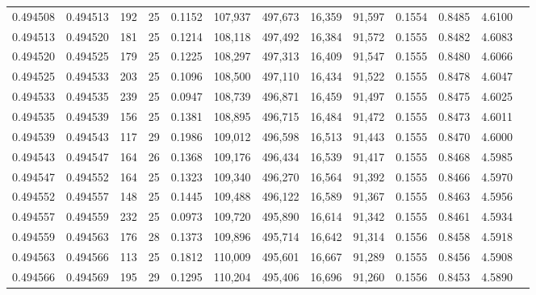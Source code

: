 \begin{tabular}{rrrrrrrrrrrrr}
0.494508 & 0.494513 & 192 &  25 &                                     0.1152 & 107,937 & 497,673 &  16,359 &  91,597 & 0.1554 & 0.8485 & 4.6100 \\
0.494513 & 0.494520 & 181 &  25 &                                     0.1214 & 108,118 & 497,492 &  16,384 &  91,572 & 0.1555 & 0.8482 & 4.6083 \\
0.494520 & 0.494525 & 179 &  25 &                                     0.1225 & 108,297 & 497,313 &  16,409 &  91,547 & 0.1555 & 0.8480 & 4.6066 \\
0.494525 & 0.494533 & 203 &  25 &                                     0.1096 & 108,500 & 497,110 &  16,434 &  91,522 & 0.1555 & 0.8478 & 4.6047 \\
0.494533 & 0.494535 & 239 &  25 &                                     0.0947 & 108,739 & 496,871 &  16,459 &  91,497 & 0.1555 & 0.8475 & 4.6025 \\
0.494535 & 0.494539 & 156 &  25 &                                     0.1381 & 108,895 & 496,715 &  16,484 &  91,472 & 0.1555 & 0.8473 & 4.6011 \\
0.494539 & 0.494543 & 117 &  29 &                                     0.1986 & 109,012 & 496,598 &  16,513 &  91,443 & 0.1555 & 0.8470 & 4.6000 \\
0.494543 & 0.494547 & 164 &  26 &                                     0.1368 & 109,176 & 496,434 &  16,539 &  91,417 & 0.1555 & 0.8468 & 4.5985 \\
0.494547 & 0.494552 & 164 &  25 &                                     0.1323 & 109,340 & 496,270 &  16,564 &  91,392 & 0.1555 & 0.8466 & 4.5970 \\
0.494552 & 0.494557 & 148 &  25 &                                     0.1445 & 109,488 & 496,122 &  16,589 &  91,367 & 0.1555 & 0.8463 & 4.5956 \\
0.494557 & 0.494559 & 232 &  25 &                                     0.0973 & 109,720 & 495,890 &  16,614 &  91,342 & 0.1555 & 0.8461 & 4.5934 \\
0.494559 & 0.494563 & 176 &  28 &                                     0.1373 & 109,896 & 495,714 &  16,642 &  91,314 & 0.1556 & 0.8458 & 4.5918 \\
0.494563 & 0.494566 & 113 &  25 &                                     0.1812 & 110,009 & 495,601 &  16,667 &  91,289 & 0.1555 & 0.8456 & 4.5908 \\
0.494566 & 0.494569 & 195 &  29 &                                     0.1295 & 110,204 & 495,406 &  16,696 &  91,260 & 0.1556 & 0.8453 & 4.5890 \\

\end{tabular}
